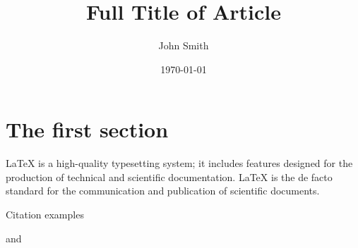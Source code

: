 \documentclass{article}
\title{Full Title of Article}
\author{John Smith}
\date{\today}
\begin{document}
\maketitle


\section{The first section}
LaTeX is a high-quality typesetting system; it includes features designed for the production of technical and scientific documentation. LaTeX is the de facto standard for the communication and publication of scientific documents.

Citation examples \cite{Tadmor2012,Shen1994,CaiFuLiuWang2022}

\cite{Adams2003,Tadmor2012} and \cite{Shen1994}


%



\end{document}
